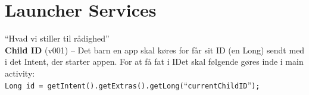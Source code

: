 % 
% 
% 
% 
% 
% 
% 

\chapter{Launcher Services}
\label{appendix:launcherservices}
``Hvad vi stiller til r\aa{}dighed''\\

\textbf{Child ID} (v001) -- Det barn en app skal k\o{}res for f\aa{}r sit ID (en Long) sendt med i det Intent, der starter appen. For at f\aa{} fat i IDet skal f\o{}lgende g\o{}res inde i main activity:\\

	\verb+Long id = getIntent().getExtras().getLong(+``\verb+currentChildID+''\verb+);+\\
	
